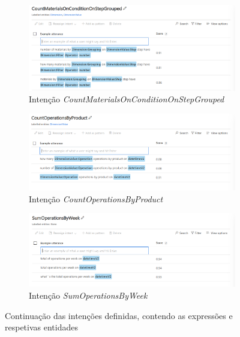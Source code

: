 %
\begin{figure}
    \centering
         \begin{subfigure}{.9\textwidth}
        \centering
        \includegraphics[width=\textwidth]{appendices/assets/kb04.png}
        \caption{Intenção \textit{CountMaterialsOnConditionOnStepGrouped}}
     \end{subfigure}
     \begin{subfigure}{.9\textwidth}
        \centering
        \includegraphics[width=\textwidth]{appendices/assets/kb05.png}
        \caption{Intenção \textit{CountOperationsByProduct}}
     \end{subfigure}
     \begin{subfigure}{.9\textwidth}
        \centering
        \includegraphics[width=\textwidth]{appendices/assets/kb06.png}
        \caption{Intenção \textit{SumOperationsByWeek}}
     \end{subfigure}
    \caption{Continuação das intenções definidas, contendo as expressões e respetivas entidades}
\end{figure}

